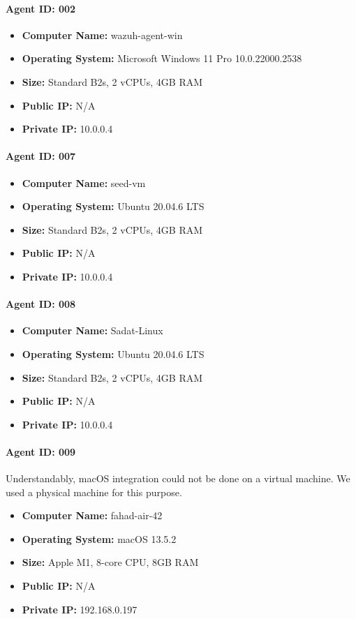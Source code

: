 \paragraph*{Agent ID: 002}
\begin{itemize}
    \item \textbf{Computer Name:} wazuh-agent-win
    \item \textbf{Operating System:} Microsoft Windows 11 Pro 10.0.22000.2538
    \item \textbf{Size:} Standard B2s, 2 vCPUs, 4GB RAM
    \item \textbf{Public IP:} N/A
    \item \textbf{Private IP:} 10.0.0.4
\end{itemize}

\paragraph*{Agent ID: 007}
\begin{itemize}
    \item \textbf{Computer Name:} seed-vm
    \item \textbf{Operating System:} Ubuntu 20.04.6 LTS
    \item \textbf{Size:} Standard B2s, 2 vCPUs, 4GB RAM
    \item \textbf{Public IP:} N/A
    \item \textbf{Private IP:} 10.0.0.4
\end{itemize}


\paragraph*{Agent ID: 008}
\begin{itemize}
    \item \textbf{Computer Name:} Sadat-Linux
    \item \textbf{Operating System:} Ubuntu 20.04.6 LTS
    \item \textbf{Size:} Standard B2s, 2 vCPUs, 4GB RAM
    \item \textbf{Public IP:} N/A
    \item \textbf{Private IP:} 10.0.0.4
\end{itemize}

\paragraph*{Agent ID: 009}
Understandably, macOS integration could not be done on a virtual machine. We used a physical machine for this purpose.
\begin{itemize}
    \item \textbf{Computer Name:} fahad-air-42
    \item \textbf{Operating System:} macOS 13.5.2
    \item \textbf{Size:} Apple M1, 8-core CPU, 8GB RAM
    \item \textbf{Public IP:} N/A
    \item \textbf{Private IP:} 192.168.0.197
\end{itemize}

